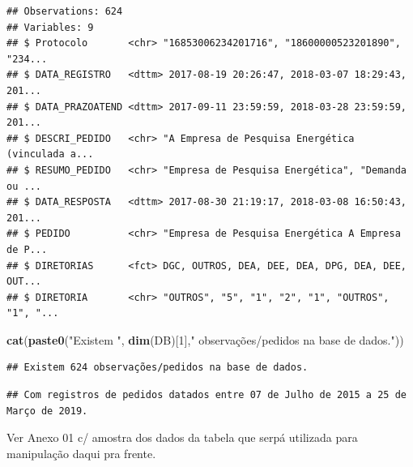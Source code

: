\documentclass[]{article}
\newenvironment{Shaded}{\begin{snugshade}}{\end{snugshade}}
\newcommand{\DecValTok}[1]{\textcolor[rgb]{0.00,0.00,0.81}{#1}}
\newcommand{\KeywordTok}[1]{\textcolor[rgb]{0.13,0.29,0.53}{\textbf{#1}}}
\newcommand{\NormalTok}[1]{#1}
\newcommand{\OperatorTok}[1]{\textcolor[rgb]{0.81,0.36,0.00}{\textbf{#1}}}
\newcommand{\StringTok}[1]{\textcolor[rgb]{0.31,0.60,0.02}{#1}}
\begin{document}
\begin{verbatim}
## Observations: 624
## Variables: 9
## $ Protocolo       <chr> "16853006234201716", "18600000523201890", "234...
## $ DATA_REGISTRO   <dttm> 2017-08-19 20:26:47, 2018-03-07 18:29:43, 201...
## $ DATA_PRAZOATEND <dttm> 2017-09-11 23:59:59, 2018-03-28 23:59:59, 201...
## $ DESCRI_PEDIDO   <chr> "A Empresa de Pesquisa Energética (vinculada a...
## $ RESUMO_PEDIDO   <chr> "Empresa de Pesquisa Energética", "Demanda ou ...
## $ DATA_RESPOSTA   <dttm> 2017-08-30 21:19:17, 2018-03-08 16:50:43, 201...
## $ PEDIDO          <chr> "Empresa de Pesquisa Energética A Empresa de P...
## $ DIRETORIAS      <fct> DGC, OUTROS, DEA, DEE, DEA, DPG, DEA, DEE, OUT...
## $ DIRETORIA       <chr> "OUTROS", "5", "1", "2", "1", "OUTROS", "1", "...
\end{verbatim}

\begin{Shaded}
\begin{Highlighting}[]
\KeywordTok{cat}\NormalTok{(}\KeywordTok{paste0}\NormalTok{(}\StringTok{"Existem "}\NormalTok{, }\KeywordTok{dim}\NormalTok{(DB)[}\DecValTok{1}\NormalTok{],}\StringTok{" observações/pedidos na base de dados."}\NormalTok{))}
\end{Highlighting}
\end{Shaded}

\begin{verbatim}
## Existem 624 observações/pedidos na base de dados.
\end{verbatim}

\begin{Shaded}
\end{Shaded}

\begin{verbatim}
## Com registros de pedidos datados entre 07 de Julho de 2015 a 25 de Março de 2019.
\end{verbatim}

Ver Anexo 01 c/ amostra dos dados da tabela que serpá utilizada para
manipulação daqui pra frente.
\end{document}
